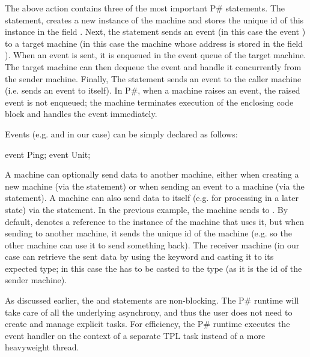 \documentclass{llncs}
\newcommand{\ps}{P\#\xspace}
\begin{document}
\noindent
The above action contains three of the most important \ps statements. The  statement, creates a new instance of the  machine and stores the unique id of this instance in the field . Next, the  statement sends an event (in this case the event ) to a target machine (in this case the machine whose address is stored in the field ). When an event is sent, it is enqueued in the event queue of the target machine. The target machine can then dequeue the event and handle it concurrently from the sender machine. Finally, The  statement sends an event to the caller machine (i.e. sends an event to itself). In \ps, when a machine raises an event, the raised event is not enqueued; the machine terminates execution of the enclosing code block and handles the event immediately.

Events (e.g.  and  in our case) can be simply declared as follows:

\begin{psharpNoLines}
event Ping;
event Unit;
\end{psharpNoLines}

\noindent
A machine can optionally send data to another machine, either when creating a new machine (via the  statement) or when sending an event to a machine (via the  statement). A machine can also send data to itself (e.g. for processing in a later state) via the  statement. In the previous example, the machine sends  to . By default,  denotes a reference to the instance of the machine that uses it, but when sending  to another machine, it sends the unique id of the machine (e.g. so the other machine can use it to send something back). The receiver machine (in our case  can retrieve the sent data by using the keyword  and casting it to its expected type; in this case the  has to be casted to the  type (as it is the id of the sender machine).

As discussed earlier, the  and  statements are non-blocking. The \ps runtime will take care of all the underlying asynchrony, and thus the user does not need to create and manage explicit tasks. For efficiency, the \ps runtime executes the event handler on the context of a separate TPL task instead of a more heavyweight thread.
\end{document}
